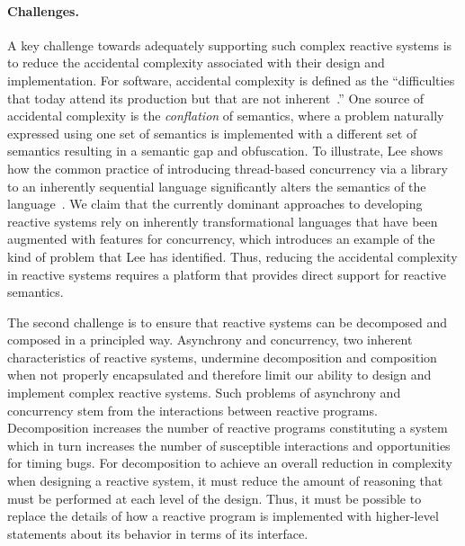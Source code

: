 \paragraph{Challenges.}
A key challenge towards adequately supporting such complex reactive systems is to reduce the accidental complexity associated with their design and implementation.
For software, accidental complexity is defined as the ``difficulties that today attend its production but that are not inherent~\cite{brooks1995mythical}.''
One source of accidental complexity is the \emph{conflation} of semantics, where a problem naturally expressed using one set of semantics is implemented with a different set of semantics resulting in a semantic gap and obfuscation.
To illustrate, Lee shows how the common practice of introducing thread-based concurrency via a library to an inherently sequential language significantly alters the semantics of the language~\cite{lee2006problem}.
We claim that the currently dominant approaches to developing reactive systems rely on inherently transformational languages that have been augmented with features for concurrency, which introduces an example of the kind of problem that Lee has identified.
Thus, reducing the accidental complexity in reactive systems requires a platform that provides direct support for reactive semantics.

The second challenge is to ensure that reactive systems can be decomposed and composed in a principled way.
Asynchrony and concurrency, two inherent characteristics of reactive systems, undermine decomposition and composition when not properly encapsulated and therefore limit our ability to design and implement complex reactive systems.
Such problems of asynchrony and concurrency stem from the interactions between reactive programs.
Decomposition increases the number of reactive programs constituting a system which in turn increases the number of susceptible interactions and opportunities for timing bugs.
For decomposition to achieve an overall reduction in complexity when designing a reactive system, it must reduce the amount of reasoning that must be performed at each level of the design.
Thus, it must be possible to replace the details of how a reactive program is implemented with higher-level statements about its behavior in terms of its interface.

